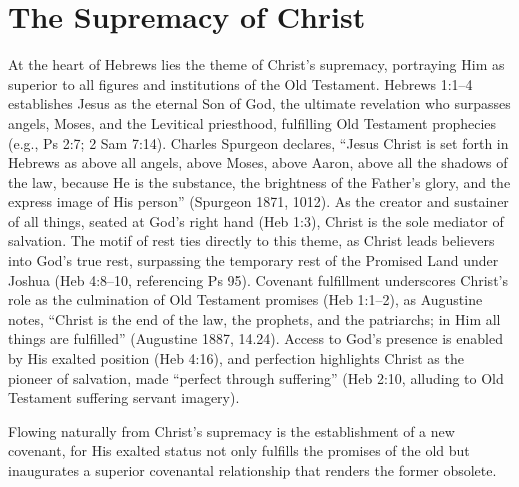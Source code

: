 \documentclass[12pt]{article}
\begin{document}
\section{The Supremacy of Christ}
At the heart of Hebrews lies the theme of Christ’s supremacy, portraying Him as
superior to all figures and institutions of the Old Testament. Hebrews 1:1--4
establishes Jesus as the eternal Son of God, the ultimate revelation who
surpasses angels, Moses, and the Levitical priesthood, fulfilling Old Testament
prophecies (e.g., Ps 2:7; 2 Sam 7:14). Charles Spurgeon declares, ``Jesus
Christ is set forth in Hebrews as above all angels, above Moses, above Aaron,
above all the shadows of the law, because He is the substance, the brightness
of the Father’s glory, and the express image of His person'' (Spurgeon 1871,
1012). As the creator and sustainer of all things, seated at God’s right hand
(Heb 1:3), Christ is the sole mediator of salvation. The motif of rest ties
directly to this theme, as Christ leads believers into God’s true rest,
surpassing the temporary rest of the Promised Land under Joshua (Heb 4:8--10,
referencing Ps 95). Covenant fulfillment underscores Christ’s role as the
culmination of Old Testament promises (Heb 1:1--2), as Augustine notes,
``Christ is the end of the law, the prophets, and the patriarchs; in Him all
things are fulfilled'' (Augustine 1887, 14.24). Access to God’s presence is
enabled by His exalted position (Heb 4:16), and perfection highlights Christ as
the pioneer of salvation, made ``perfect through suffering'' (Heb 2:10,
alluding to Old Testament suffering servant imagery).

Flowing naturally from Christ’s supremacy is the establishment of a new
covenant, for His exalted status not only fulfills the promises of the old but
inaugurates a superior covenantal relationship that renders the former obsolete.
\end{document}

